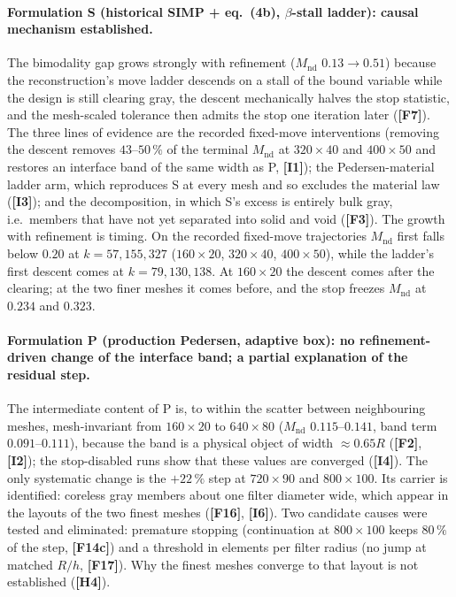 \documentclass[10pt,a4paper]{article}
\newcommand{\Mnd}{M_{\mathrm{nd}}}
\newcommand{\fact}[1]{\textbf{[F#1]}}
\newcommand{\interp}[1]{\textbf{[I#1]}}
\newcommand{\hyp}[1]{\textbf{[H#1]}}
\begin{document}
\paragraph{Formulation S (historical SIMP + eq.~(4b), $\beta$-stall ladder): causal mechanism established.} The bimodality gap grows strongly with refinement ($\Mnd$ $0.13\to0.51$) because the reconstruction's move ladder descends on a stall of the bound variable while the design is still clearing gray, the descent mechanically halves the stop statistic, and the mesh-scaled tolerance then admits the stop one iteration later (\fact{7}). The three lines of evidence are the recorded fixed-move interventions (removing the descent removes $43$--$50\,\%$ of the terminal $\Mnd$ at $320\times40$ and $400\times50$ and restores an interface band of the same width as P, \interp{1}); the Pedersen-material ladder arm, which reproduces S at every mesh and so excludes the material law (\interp{3}); and the decomposition, in which S's excess is entirely bulk gray, i.e.\ members that have not yet separated into solid and void (\fact{3}). The growth with refinement is timing. On the recorded fixed-move trajectories $\Mnd$ first falls below $0.20$ at $k=57,155,327$ ($160\times20$, $320\times40$, $400\times50$), while the ladder's first descent comes at $k=79,130,138$. At $160\times20$ the descent comes after the clearing; at the two finer meshes it comes before, and the stop freezes $\Mnd$ at $0.234$ and $0.323$.

\paragraph{Formulation P (production Pedersen, adaptive box): no refinement-driven change of the interface band; a partial explanation of the residual step.} The intermediate content of P is, to within the scatter between neighbouring meshes, mesh-invariant from $160\times20$ to $640\times80$ ($\Mnd$ $0.115$--$0.141$, band term $0.091$--$0.111$), because the band is a physical object of width $\approx0.65R$ (\fact{2}, \interp{2}); the stop-disabled runs show that these values are converged (\interp{4}). The only systematic change is the $+22\,\%$ step at $720\times90$ and $800\times100$. Its carrier is identified: coreless gray members about one filter diameter wide, which appear in the layouts of the two finest meshes (\fact{16}, \interp{6}). Two candidate causes were tested and eliminated: premature stopping (continuation at $800\times100$ keeps $80\,\%$ of the step, \fact{14c}) and a threshold in elements per filter radius (no jump at matched $R/h$, \fact{17}). Why the finest meshes converge to that layout is not established (\hyp{4}).
\end{document}

